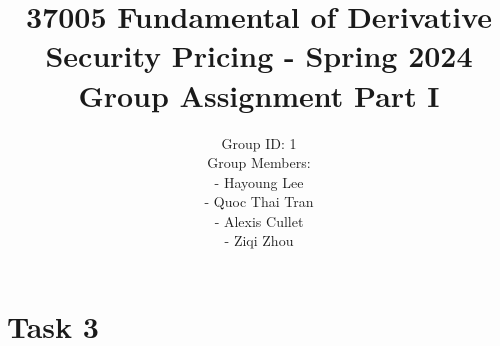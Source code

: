 \documentclass{article}
\begin{document}
\title{37005 Fundamental of Derivative Security Pricing - Spring 2024\\
Group Assignment Part I }
\author{Group ID: 1\\
Group Members:\\
- Hayoung Lee\\
- Quoc Thai Tran\\
- Alexis Cullet\\
- Ziqi Zhou}
\date{}
\maketitle

\section*{Task 3}
\end{document}
